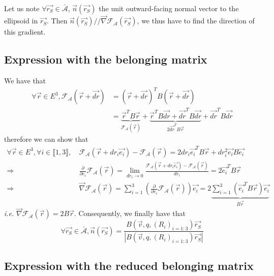\documentclass[class=report, float=false, crop=false]{standalone}
\begin{document}
Let us note $\forall \vec{r_S} \in \bar{\mathcal{A}}$, $\vec{n}(\vec{r_S})$ the unit outward-facing normal vector to the ellipsoid in $\vec{r_S}$. Then $\vec{n}(\vec{r_S}) // \vec{\nabla}\mathcal{F}_{\mathcal{A}}(\vec{r_S})$, we thus have to find the direction of this gradient.

\subsection{Expression with the belonging matrix}
\label{normal_vector_belonging}

We have that
\begin{align*}
\forall \vec{r} \in E^3, \mathcal{F}_{\mathcal{A}}(\vec{r} + \vec{dr}) &= (\vec{r} + \vec{dr})^TB(\vec{r} + \vec{dr})\\
&= \underbrace{\vec{r}^TB\vec{r}}_{\mathcal{F}_{\mathcal{A}}(\vec{r})} + \underbrace{\vec{r}^TB\vec{dr} + \vec{dr}^TB\vec{dr}}_{2\vec{dr}^TB\vec{r}} + \vec{dr}^TB\vec{dr}
\end{align*}
therefore we can show that
\begin{align*}
\forall \vec{r} \in E^3, \forall i \in \llbracket1,3\rrbracket,~ &\mathcal{F}_{\mathcal{A}}(\vec{r} + dr_i\vec{e_i}) - \mathcal{F}_{\mathcal{A}}(\vec{r}) = 2dr_i\vec{e_i}^TB\vec{r} + dr_i^2\vec{e_i}B\vec{e_i}\\
\Rightarrow&\frac{\partial}{\partial e_i}\mathcal{F}_{\mathcal{A}}(\vec{r}) = \lim_{dr_i \to 0} \frac{\mathcal{F}_{\mathcal{A}}(\vec{r} + dr_i\vec{e_i}) - \mathcal{F}_{\mathcal{A}}(\vec{r})}{dr_i} = 2\vec{e_i}^TB\vec{r}\\
\Rightarrow&\vec{\nabla}\mathcal{F}_{\mathcal{A}}(\vec{r}) = \sum_{i=1}^3\left(\frac{\partial}{\partial e_i}\mathcal{F}_{\mathcal{A}}(\vec{r})\right)\vec{e_i} = 2\underbrace{\sum_{i=1}^3(\vec{e_i}^TB\vec{r})\vec{e_i}}_{B\vec{r}}
\end{align*}
\textit{i.e.} $\vec{\nabla}\mathcal{F}_{\mathcal{A}}(\vec{r}) = 2B\vec{r}$. Consequently, we finally have that
\begin{equation}
\boxed{\forall \vec{r_S}\in \bar{\mathcal{A}}, \vec{n}(\vec{r_S}) = \frac{B(\vec{v},q,(R_i)_{i=1:3})\vec{r_S}}{|B(\vec{v},q,(R_i)_{i=1:3})\vec{r_S}|}}
\end{equation}

\subsection{Expression with the reduced belonging matrix}
\end{document}

